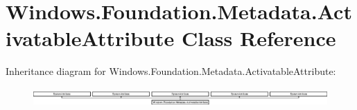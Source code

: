 \hypertarget{class_windows_1_1_foundation_1_1_metadata_1_1_activatable_attribute}{}\section{Windows.\+Foundation.\+Metadata.\+Activatable\+Attribute Class Reference}
\label{class_windows_1_1_foundation_1_1_metadata_1_1_activatable_attribute}
Inheritance diagram for Windows.\+Foundation.\+Metadata.\+Activatable\+Attribute\+:\begin{figure}[H]
\begin{center}
\leavevmode
\includegraphics[height=0.729642cm]{class_windows_1_1_foundation_1_1_metadata_1_1_activatable_attribute}
\end{center}
\end{figure}
